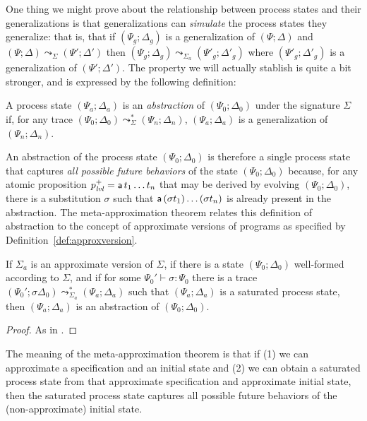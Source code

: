 One thing we might prove about the relationship between process states
and their generalizations is that generalizations can {\it simulate}
the process states they generalize: that is, that if $(\Psi_g;
\Delta_g)$ is a generalization of $(\Psi; \Delta)$ and $(\Psi; \Delta)
\leadsto_\Sigma (\Psi'; \Delta')$ then $(\Psi_g; \Delta_g)
\leadsto_{\Sigma_a} (\Psi'_g; \Delta'_g)$ where $(\Psi'_g; \Delta'_g)$
is a generalization of $(\Psi'; \Delta')$. The property we will
actually stablish is quite a bit stronger, and is expressed by the
following definition:

\bigskip
\begin{definition}
A process state $(\Psi_a; \Delta_a)$ is an {\em abstraction} of 
$(\Psi_0; \Delta_0)$ under the signature $\Sigma$ if, for any trace
$(\Psi_0; \Delta_0) \leadsto^*_\Sigma (\Psi_n; \Delta_n)$, 
$(\Psi_a; \Delta_a)$ is a generalization of $(\Psi_n; \Delta_n)$. 
\end{definition}
\bigskip

An abstraction of the process state $(\Psi_0; \Delta_0)$ is therefore
a single process state that captures {\it all possible future
  behaviors} of the state $(\Psi_0; \Delta_0)$ because, for any atomic
proposition $p^+_{\it lvl} = {\sf a}\,t_1\ldots t_n$ that may be derived
by evolving $(\Psi_0; \Delta_0)$, there is a substitution $\sigma$
such that ${\sf a}\,(\sigma t_1)\ldots(\sigma t_n)$ is already present
in the abstraction. The meta-approximation theorem relates this definition
of abstraction to the concept of approximate versions of programs as
specified by Definition~\ref{def:approxversion}.  

\bigskip
\begin{theorem}\label{thm:metapprox}
  If $\Sigma_a$ is an approximate version of $\Sigma$, if there is a
  state $(\Psi_0; \Delta_0)$ well-formed according to $\Sigma$, and if
  for some $\Psi_0' \vdash \sigma : \Psi_0$ there is a trace
  $(\Psi_0'; \sigma\Delta_0) \leadsto^*_{\Sigma_a} (\Psi_a; \Delta_a)$
  such that $(\Psi_a; \Delta_a)$ is a saturated process state, then
  $(\Psi_a; \Delta_a)$ is an abstraction of $(\Psi_0; \Delta_0)$.
\end{theorem}

\begin{proof}
As in \cite[Theorem 3]{simmons11logical}.
\end{proof}

The meaning of the meta-approximation theorem is that if (1) we can
approximate a specification and an initial state and (2) we can obtain
a saturated process state from that approximate specification
and approximate initial state, then the saturated process state captures
all possible future behaviors of the (non-approximate) initial state. 

